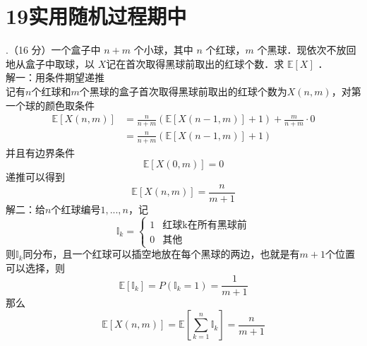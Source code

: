 \documentclass[UTF8,openany]{book}
\begin{document}
\section{\centering 19实用随机过程期中}
.（16 分）一个盒子中 $n+m$ 个小球，其中 $n$ 个红球，$m$ 个黑球．现依次不放回地从盒子中取球，以 $X$记在首次取得黑球前取出的红球个数．求 $\mathbb{E} [X]$ ．\\
解一：用条件期望递推\\
记有$n$个红球和$m$个黑球的盒子首次取得黑球前取出的红球个数为$X(n,m)$，对第一个球的颜色取条件\\
\begin{align*}
	\mathbb{E}[X(n,m)] & =\frac{n}{n+m}\left( \mathbb{E}[X(n-1,m)]+1 \right)+\frac{m}{n+m}\cdot 0 \\
	&=\frac{n}{n+m}\left( \mathbb{E}[X(n-1,m)]+1 \right)
\end{align*}
并且有边界条件
\[
\mathbb{E}[X(0,m)]=0
\]
递推可以得到
\[
\mathbb{E}[X(n,m)]=\frac{n}{m+1}
\]
解二：给$n$个红球编号$1,...,n$，记
\[
\mathbb{I}_k=
\begin{cases}
	1  &  \text{红球k在所有黑球前} \\
	0  &  \text{其他}
\end{cases}
\]
则$\mathbb{I}_k$同分布，且一个红球可以插空地放在每个黑球的两边，也就是有$m+1$个位置可以选择，则
\[
\mathbb{E}[\mathbb{I}_k]=P(\mathbb{I}_k=1)=\frac{1}{m+1}
\]
那么
\[
\mathbb{E}[X(n,m)]=\mathbb{E}\left[\sum_{k=1}^n  \mathbb{I}_k \right]=\frac{n}{m+1} 
\]\\
\end{document}
